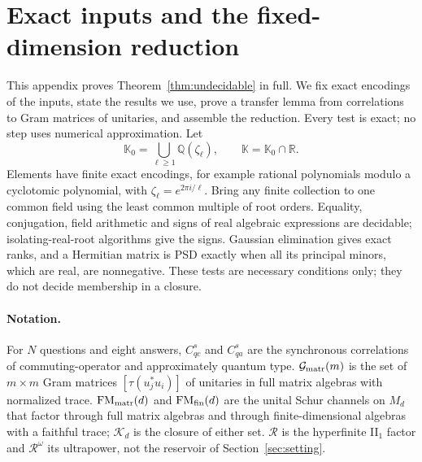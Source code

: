 \documentclass[11pt]{article}
\theoremstyle{definition}
\theoremstyle{remark}
\providecommand{\R}{\mathcal R}
\providecommand{\G}{\mathcal G}
\providecommand{\K}{\mathcal K}
\begin{document}
\section{Exact inputs and the fixed-dimension reduction}\label{app:fixeddim}
This appendix proves Theorem~\ref{thm:undecidable} in full. We fix exact encodings of the inputs, state the results we use, prove a transfer lemma from correlations to Gram matrices of unitaries, and assemble the reduction. Every test is exact; no step uses numerical approximation. Let
\[
\mathbb K_0=\bigcup_{\ell\ge1}\mathbb Q(\zeta_\ell),\qquad \mathbb K=\mathbb K_0\cap\mathbb R.
\]
Elements have finite exact encodings, for example rational polynomials modulo a cyclotomic polynomial, with $\zeta_\ell=e^{2\pi i/\ell}$. Bring any finite collection to one common field using the least common multiple of root orders. Equality, conjugation, field arithmetic and signs of real algebraic expressions are decidable; isolating-real-root algorithms give the signs. Gaussian elimination gives exact ranks, and a Hermitian matrix is PSD exactly when all its principal minors, which are real, are nonnegative. These tests are necessary conditions only; they do not decide membership in a closure.

\paragraph{Notation.} For $N$ questions and eight answers, $C_{qc}^s$ and $C_{qa}^s$ are the synchronous correlations of commuting-operator and approximately quantum type. $\G_{\rm matr}(m)$ is the set of $m\times m$ Gram matrices $[\tau(u_j^*u_i)]$ of unitaries in full matrix algebras with normalized trace. $\mathrm{FM}_{\rm matr}(d)$ and $\mathrm{FM}_{\rm fin}(d)$ are the unital Schur channels on $M_d$ that factor through full matrix algebras and through finite-dimensional algebras with a faithful trace; $\K_d$ is the closure of either set. $\R$ is the hyperfinite II$_1$ factor and $\R^\omega$ its ultrapower, not the reservoir of Section~\ref{sec:setting}.
\end{document}
